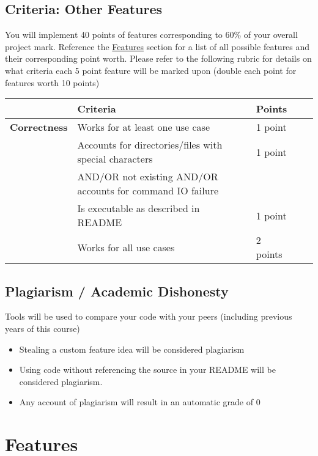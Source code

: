 \documentclass[11pt]{article}
\begin{document}
\subsection{Criteria: Other Features}
\label{sec:orgf87a718}
You will implement {\color{purple}40 points} of features corresponding
to {\color{purple}60\%} of your overall project mark. Reference the \hyperref[sec:features]{Features}
section for a list of all possible features and their corresponding point
worth. Please refer to the following rubric for details on what criteria each
5 point feature will be marked upon (double each point for features worth 10 points)

\begin{center}
\begin{tabular}{|l|l|l|l|l|}
 & \textbf{Criteria} & \textbf{Points}\\
\hline
\textbf{Correctness} & Works for at least one use case & 1 point\\
 & Accounts for directories/files with special characters & 1 point\\
 & AND/OR not existing AND/OR accounts for command IO failure & \\
 & Is executable as described in README & 1 point\\
 & Works for all use cases & 2 points\\
\end{tabular}
\end{center}

\subsection{Plagiarism / Academic Dishonesty}
\label{sec:orgddc7b5d}
Tools will be used to compare your code with your peers (including previous
years of this course) 
\begin{itemize}
\item Stealing a custom feature idea will be considered plagiarism
\item Using code without referencing the source in your README will be considered
plagiarism.
\item Any account of plagiarism will result in an automatic grade of 0
\end{itemize}

\newpage

\section{Features}
\label{sec:features}
\end{document}
